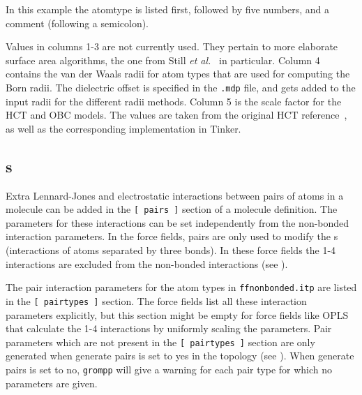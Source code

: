 In this example the atomtype is listed first, followed by five
numbers, and a comment (following a semicolon).

Values in columns 1-3 are not currently used. They pertain to more
elaborate surface area algorithms, the one from Still {\em et al.}~\cite{Still97} in
particular.  Column 4 contains the van der Waals radii for atom types that are used
for computing the Born radii. The dielectric offset is specified in
the {\tt *.mdp} file, and gets added to the input radii for the different
radii methods.  Column 5 is the scale factor for the HCT and OBC
models. The values are taken from the original HCT reference~\cite{Truhlar96}, as well
as the corresponding implementation in Tinker.


\subsection{s}
Extra Lennard-Jones and electrostatic interactions between pairs
of atoms in a molecule can be added in the {\tt [~pairs~]} section of
a molecule definition. The parameters for these interactions can
be set independently from the non-bonded interaction parameters.
In the {\gromos} force fields, pairs are only used
to modify the s (interactions of atoms
separated by three bonds). In these force fields the 1-4 interactions
are excluded from the non-bonded interactions (see ).

The pair interaction parameters for the atom types
in {\tt ffnonbonded.itp} are listed in the {\tt [~pairtypes~]} section.
The {\gromos} force fields list all these interaction parameters
explicitly, but this section might be empty for force fields like
OPLS that calculate the 1-4 interactions by uniformly scaling the parameters.
Pair parameters which are not present in the {\tt [~pairtypes~]} section
are only generated when generate pairs is set to yes in the topology
(see ). When generate pairs is set to no, {\tt grompp}
will give a warning for each pair type for which no parameters are given.

